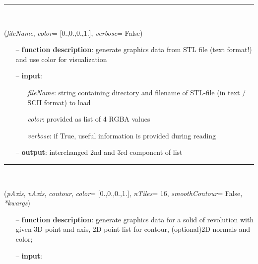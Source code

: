 \begin{itemize}[leftmargin=1.4cm]
\begin{itemize}[leftmargin=0.5cm]
\begin{itemize}[leftmargin=1.4cm]
\begin{itemize}[leftmargin=1.4cm]
\begin{itemize}[leftmargin=0.5cm]
\begin{itemize}[leftmargin=1.4cm]
\begin{itemize}[leftmargin=0.5cm]
%
\noindent\rule{8cm}{0.75pt}\vspace{1pt} \\ 
\begin{flushleft}
\label{sec:graphicsDataUtilities:GraphicsDataFromSTLfileTxt}
({\it fileName}, {\it color}= [0.,0.,0.,1.], {\it verbose}= False)
\end{flushleft}
\setlength{\itemindent}{0.7cm}
\begin{itemize}[leftmargin=0.7cm]
  \item[--]  {\bf function description}: generate graphics data from STL file (text format!) and use color for visualization  \item[--]  {\bf input}: \vspace{-6pt}
  \begin{itemize}[leftmargin=1.2cm]
\setlength{\itemindent}{-0.7cm}
    \item[] {\it fileName}: string containing directory and filename of STL-file (in text / SCII format) to load
    \item[] {\it   color}: provided as list of 4 RGBA values
    \item[] {\it   verbose}: if True, useful information is provided during reading
  \end{itemize}
  \item[--]  {\bf output}: interchanged 2nd and 3rd component of list\vspace{12pt}\end{itemize}
%
\noindent\rule{8cm}{0.75pt}\vspace{1pt} \\ 
\begin{flushleft}
\label{sec:graphicsDataUtilities:GraphicsDataSolidOfRevolution}
({\it pAxis}, {\it vAxis}, {\it contour}, {\it color}= [0.,0.,0.,1.], {\it nTiles}= 16, {\it smoothContour}= False, {\it **kwargs})
\end{flushleft}
\setlength{\itemindent}{0.7cm}
\begin{itemize}[leftmargin=0.7cm]
  \item[--]  {\bf function description}: generate graphics data for a solid of revolution with given 3D point and axis, 2D point list for contour, (optional)2D normals and color;  \item[--]  {\bf input}: \vspace{-6pt}

\end{itemize}
\end{itemize}
\end{itemize}
\end{itemize}
\end{itemize}
\end{itemize}
\end{itemize}
\end{itemize}
